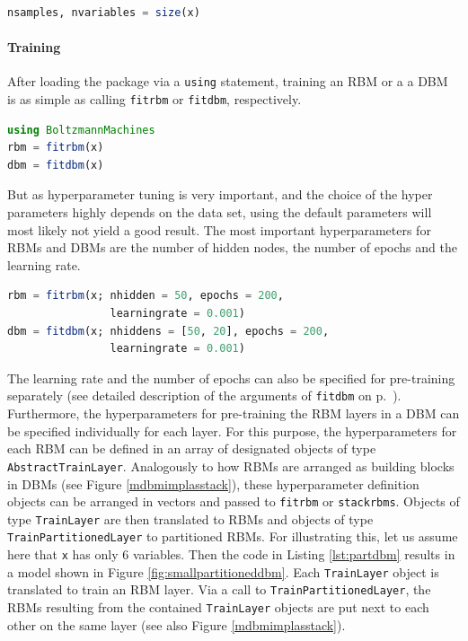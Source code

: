 \documentclass[12pt]{article}
\newcommand{\inlinecode}[1]{\texttt{#1}}
\begin{document}
\begin{lstlisting}[language=Julia]
nsamples, nvariables = size(x)
\end{lstlisting}

\paragraph{Training}\label{trainingimpl}

After loading the package via a \inlinecode{using} statement, training an RBM or a a DBM is as simple as calling \inlinecode{fitrbm} or \inlinecode{fitdbm}, respectively.

\begin{lstlisting}[language=Julia]
using BoltzmannMachines
rbm = fitrbm(x)
dbm = fitdbm(x)
\end{lstlisting}

But as hyperparameter tuning is very important, and the choice of the hyper parameters highly depends on the data set, using the default parameters will most likely not yield a good result.
The most important hyperparameters for RBMs and DBMs are the number of hidden nodes, the number of epochs and the learning rate.

\begin{lstlisting}[language=Julia]
rbm = fitrbm(x; nhidden = 50, epochs = 200,
                learningrate = 0.001)
dbm = fitdbm(x; nhiddens = [50, 20], epochs = 200,
                learningrate = 0.001)
\end{lstlisting}

The learning rate and the number of epochs can also be specified for pre-training separately (see detailed description of the arguments of \inlinecode{fitdbm} on p.\ \pageref{bms_fitdbm}).
Furthermore, the hyperparameters for pre-training the RBM layers in a DBM can be specified individually for each layer.
For this purpose, the hyperparameters for each RBM can be defined in an array of designated objects of type \inlinecode{AbstractTrainLayer}.
Analogously to how RBMs are arranged as building blocks in DBMs (see Figure \ref{mdbmimplasstack}), these hyperparameter definition objects can be arranged in vectors and passed to \inlinecode{fitrbm} or \inlinecode{stackrbms}.
Objects of type \inlinecode{TrainLayer} are then translated to RBMs and objects of type \inlinecode{TrainPartitionedLayer} to partitioned RBMs.
For illustrating this, let us assume here that \inlinecode{x} has only 6 variables.
Then the code in Listing \ref{lst:partdbm} results in a model shown in Figure \ref{fig:smallpartitioneddbm}.
Each \inlinecode{TrainLayer} object is translated to train an RBM layer.
Via a call to \inlinecode{TrainPartitionedLayer}, the RBMs resulting from the contained \inlinecode{TrainLayer} objects are put next to each other on the same layer (see also Figure \ref{mdbmimplasstack}).
\end{document}
